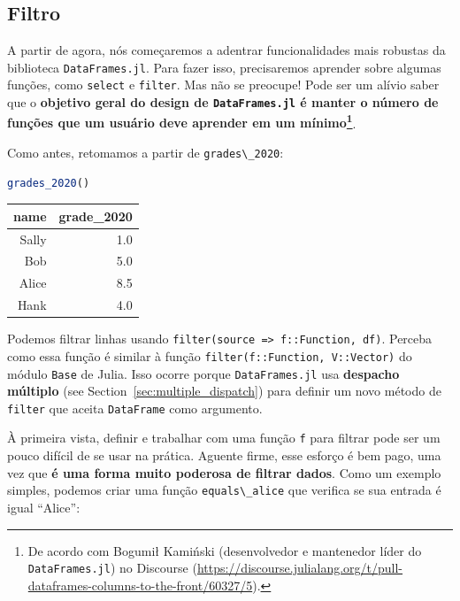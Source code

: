 \documentclass[
  notoc %
]{tufte-book}
\newcommand{\passthrough}[1]{#1}
\begin{document}
\hypertarget{sec:filter}{%
\subsection{Filtro}\label{sec:filter}}

A partir de agora, nós começaremos a adentrar funcionalidades mais
robustas da biblioteca \passthrough{\lstinline!DataFrames.jl!}. Para
fazer isso, precisaremos aprender sobre algumas funções, como
\passthrough{\lstinline!select!} e \passthrough{\lstinline!filter!}. Mas
não se preocupe! Pode ser um alívio saber que o \textbf{objetivo geral
do design de \passthrough{\lstinline!DataFrames.jl!} é manter o número
de funções que um usuário deve aprender em um mínimo\footnote{De acordo
  com Bogumił Kamiński (desenvolvedor e mantenedor líder do
  \passthrough{\lstinline!DataFrames.jl!}) no Discourse
  (\url{https://discourse.julialang.org/t/pull-dataframes-columns-to-the-front/60327/5}).}}.

Como antes, retomamos a partir de
\passthrough{\lstinline!grades\_2020!}:

\begin{lstlisting}[language=Julia]
grades_2020()
\end{lstlisting}

\begin{longtable}[]{@{}rr@{}}
\toprule
name & grade\_2020 \\
\midrule
\endhead
Sally & 1.0 \\
Bob & 5.0 \\
Alice & 8.5 \\
Hank & 4.0 \\
\bottomrule
\end{longtable}

Podemos filtrar linhas usando
\passthrough{\lstinline!filter(source => f::Function, df)!}. Perceba
como essa função é similar à função
\passthrough{\lstinline!filter(f::Function, V::Vector)!} do módulo
\passthrough{\lstinline!Base!} de Julia. Isso ocorre porque
\passthrough{\lstinline!DataFrames.jl!} usa \textbf{despacho múltiplo}
(see Section~\ref{sec:multiple_dispatch}) para definir um novo método de
\passthrough{\lstinline!filter!} que aceita
\passthrough{\lstinline!DataFrame!} como argumento.

À primeira vista, definir e trabalhar com uma função
\passthrough{\lstinline!f!} para filtrar pode ser um pouco difícil de se
usar na prática. Aguente firme, esse esforço é bem pago, uma vez que
\textbf{é uma forma muito poderosa de filtrar dados}. Como um exemplo
simples, podemos criar uma função
\passthrough{\lstinline!equals\_alice!} que verifica se sua entrada é
igual ``Alice'':
\end{document}
